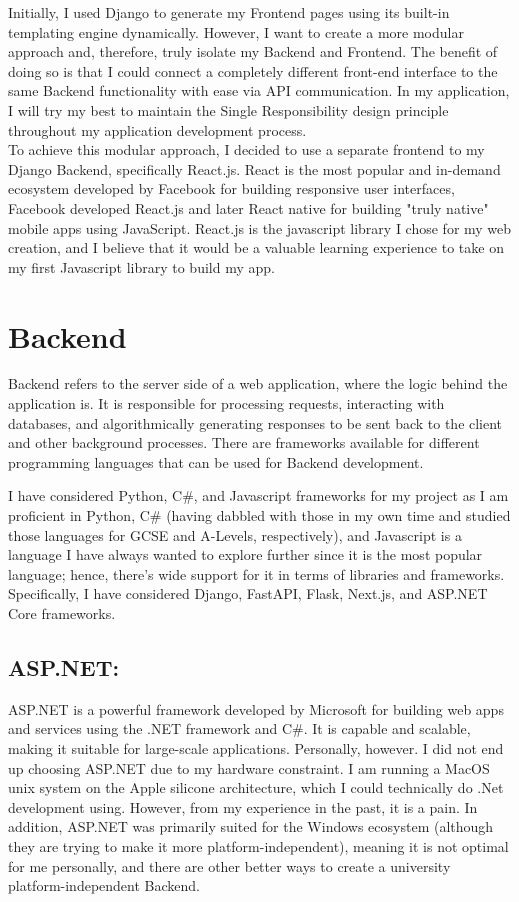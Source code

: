 Initially, I used Django to generate my Frontend pages using its built-in templating engine dynamically. However, I want to create a more modular approach and, therefore, truly isolate my Backend and Frontend. The benefit of doing so is that I could connect a completely different front-end interface to the same Backend functionality with ease via API communication. In my application, I will try my best to maintain the Single Responsibility design principle throughout my application development process.\\
To achieve this modular approach, I decided to use a separate frontend to my Django Backend, specifically React.js. React is the most popular and in-demand ecosystem developed by Facebook for building responsive user interfaces, Facebook developed React.js and later React native for building "truly native" mobile apps using JavaScript. React.js is the javascript library I chose for my web creation, and I believe that it would be a valuable learning experience to take on my first Javascript library to build my app.

\section{Backend}
Backend refers to the server side of a web application, where the logic behind the application is. It is responsible for processing requests, interacting with databases, and algorithmically generating responses to be sent back to the client and other background processes. There are frameworks available for different programming languages that can be used for Backend development.

I have considered Python, C\#, and Javascript frameworks for my project as I am proficient in Python, C\# (having dabbled with those in my own time and studied those languages for GCSE and A-Levels, respectively), and Javascript is a language I have always wanted to explore further since it is the most popular language; hence, there's wide support for it in terms of libraries and frameworks. Specifically, I have considered Django, FastAPI, Flask, Next.js, and ASP.NET Core frameworks.

\subsection{ASP.NET:}
ASP.NET is a powerful framework developed by Microsoft for building web apps and services using the .NET framework and C\#. It is capable and scalable, making it suitable for large-scale applications. Personally, however. I did not end up choosing ASP.NET due to my hardware constraint. I am running a MacOS unix system on the Apple silicone architecture, which I could technically do .Net development using. However, from my experience in the past, it is a pain. In addition, ASP.NET was primarily suited for the Windows ecosystem (although they are trying to make it more platform-independent), meaning it is not optimal for me personally, and there are other better ways to create a university platform-independent Backend.

